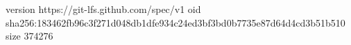 version https://git-lfs.github.com/spec/v1
oid sha256:183462fb96c3f271d048db1dfe934c24ed3bf3bd0b7735e87d64d4cd3b51b510
size 374276
